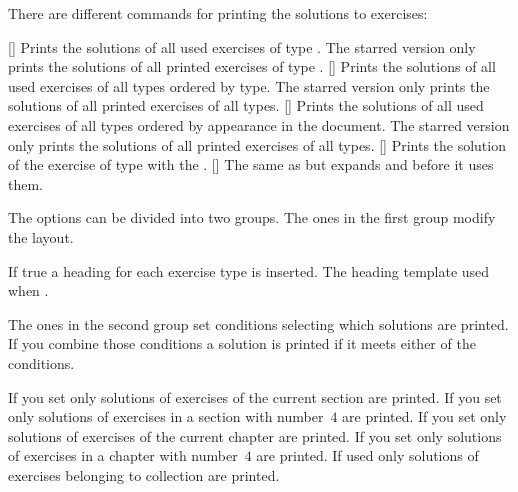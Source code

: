 \documentclass{xsim-manual}
\begin{document}
There are different commands for printing the solutions to exercises:
\begin{commands}
  [\sarg{}]
    Prints the solutions of all used exercises of type .
    The starred version only prints the solutions of all printed exercises of
    type .
  [\sarg{}]
    Prints the solutions of all used exercises of all types ordered by type.
    The starred version only prints the solutions of all printed exercises of
    all types.
  [\sarg{}]
    Prints the solutions of all used exercises of all types ordered by
    appearance in the document.  The starred version only prints the solutions
    of all printed exercises of all types.
  []
    Prints the solution of the exercise of type  with the
     .
  []
    The same as  but expands 
    and  before it uses them.
\end{commands}

\begin{example}
\end{example}

The options can be divided into two groups.  The ones in the first group
modify the layout.
\begin{options}
    If true a heading for each exercise type is inserted.
    The heading template used when .
\end{options}

The ones in the second group set conditions selecting which solutions are
printed.  If you combine those conditions a solution is printed if it meets
either of the conditions.
\begin{options}
    If you set  only solutions of exercises of the
    current section are printed.  If you set  only solutions
    of exercises in a section with number~$4$ are printed.
    If you set  only solutions of exercises of the
    current chapter are printed.  If you set  only solutions
    of exercises in a chapter with number~$4$ are printed.
    If used only solutions of exercises belonging to collection
     are printed.
\end{options}
\end{document}
